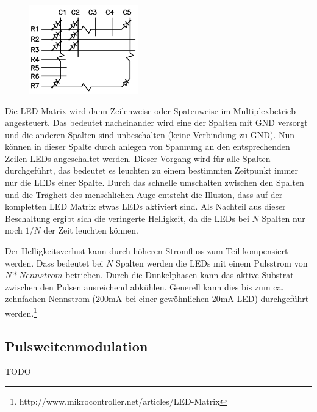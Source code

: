 \begin{figure}
  \vspace{-25pt}
  \begin{center}
    \includegraphics[width=0.42\textwidth]{skizzen/led_matrix_5x7.png}
  \end{center}
  \vspace{-20pt}
\end{figure}

Die LED Matrix
wird dann Zeilenweise oder Spatenweise im Multiplexbetrieb angesteuert. Das bedeutet nacheinander wird eine der Spalten mit GND versorgt und die anderen Spalten sind unbeschalten (keine Verbindung zu GND). Nun können in dieser Spalte durch anlegen von Spannung an den entsprechenden Zeilen LEDs angeschaltet werden. 
Dieser Vorgang wird für alle Spalten durchgeführt, das bedeutet es leuchten zu
einem bestimmten Zeitpunkt immer nur die LEDs einer Spalte. Durch das schnelle
umschalten zwischen den Spalten und die Trägheit des menschlichen Auge entsteht
die Illusion, dass auf der kompletten LED Matrix etwas LEDs aktiviert sind.
Als Nachteil aus dieser Beschaltung ergibt sich die veringerte Helligkeit, da
die LEDs bei $N$ Spalten nur noch $1/N$ der Zeit leuchten können.

Der Helligkeitsverlust kann durch höheren Stromfluss zum Teil kompensiert
werden. Dass bedeutet bei $N$ Spalten werden die LEDs mit einem Pulsstrom von
$N*Nennstrom$ betrieben. Durch die Dunkelphasen kann das aktive Substrat
zwischen den Pulsen ausreichend abkühlen. Generell kann dies bis zum ca.
zehnfachen Nennstrom (200mA bei einer gewöhnlichen 20mA LED) durchgeführt
werden.\footnote{http://www.mikrocontroller.net/articles/LED-Matrix}




\subsection{Pulsweitenmodulation}\label{sec_pulsweitenmodulation}
TODO

